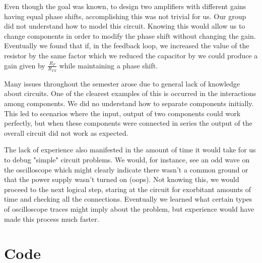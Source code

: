 \documentclass{article}	%
\begin{document}
\begin{multicols}{2}
Even though the goal was known,
to design two amplifiers with different gains 
having equal phase shifts,
accomplishing this was not trivial for us.
Our group did not understand how to model this circuit.
Knowing this would allow us to change components in
order to modify the phase shift without changing the gain.
Eventually we found that if, in the feedback loop,
we increased the value of the resistor by the same
factor which we reduced the capacitor by we could
produce a gain given by $\frac{R_F}{R_{IN}}$
while maintaining a phase shift.

Many issues throughout the semester arose 
due to general lack of knowledge about circuits.
One of the clearest examples of this is occurred
in the interactions among components.
We did no understand how to separate
components initially.
This led to scenarios where the input, output of 
two components could work perfectly, but 
when these components were connected in
series the output of the overall
circuit did not work as expected.

The lack of experience also manifested in
the amount of time it would take for 
us to debug "simple" circuit problems.
We would, for instance, see an odd
wave on the oscilloscope which might clearly
indicate there wasn't a common ground or 
that the power supply wasn't turned on (oops).
Not knowing this,
we would proceed to the next logical step,
staring at the circuit for exorbitant amounts of time
and checking all the connections.
Eventually we learned what certain types of
oscilloscope traces might imply about the problem, but
experience would have made this process much faster.

\end{multicols}

\newpage
\section{Code}




%
%



\end{document}
